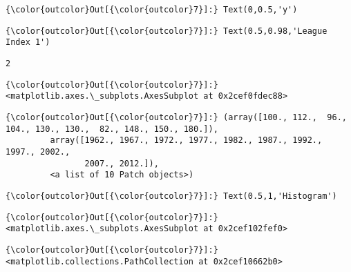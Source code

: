 \documentclass[11pt]{article}
\begin{document}
\begin{Verbatim}[commandchars=\\\{\}]
{\color{outcolor}Out[{\color{outcolor}7}]:} Text(0,0.5,'y')
\end{Verbatim}
            
\begin{Verbatim}[commandchars=\\\{\}]
{\color{outcolor}Out[{\color{outcolor}7}]:} Text(0.5,0.98,'League Index 1')
\end{Verbatim}
            
    \begin{Verbatim}[commandchars=\\\{\}]
2

    \end{Verbatim}

\begin{Verbatim}[commandchars=\\\{\}]
{\color{outcolor}Out[{\color{outcolor}7}]:} <matplotlib.axes.\_subplots.AxesSubplot at 0x2cef0fdec88>
\end{Verbatim}
            
\begin{Verbatim}[commandchars=\\\{\}]
{\color{outcolor}Out[{\color{outcolor}7}]:} (array([100., 112.,  96., 104., 130., 130.,  82., 148., 150., 180.]),
         array([1962., 1967., 1972., 1977., 1982., 1987., 1992., 1997., 2002.,
                2007., 2012.]),
         <a list of 10 Patch objects>)
\end{Verbatim}
            
\begin{Verbatim}[commandchars=\\\{\}]
{\color{outcolor}Out[{\color{outcolor}7}]:} Text(0.5,1,'Histogram')
\end{Verbatim}
            
\begin{Verbatim}[commandchars=\\\{\}]
{\color{outcolor}Out[{\color{outcolor}7}]:} <matplotlib.axes.\_subplots.AxesSubplot at 0x2cef102fef0>
\end{Verbatim}
            
\begin{Verbatim}[commandchars=\\\{\}]
{\color{outcolor}Out[{\color{outcolor}7}]:} <matplotlib.collections.PathCollection at 0x2cef10662b0>
\end{Verbatim}
            
\end{document}
